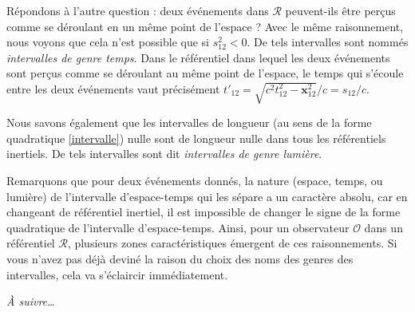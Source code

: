 		Répondons à l'autre question : deux événements dans $\mathscr{R}$ peuvent-ils être perçus comme se déroulant en un même point de l'espace ? Avec le même raisonnement, nous voyons que cela n'est possible que si $s_{12}^2<0$. De tels intervalles sont nommés \emph{intervalles de genre temps}. Dans le référentiel dans lequel les deux événements sont perçus comme se déroulant au même point de l'espace, le temps qui s'écoule entre les deux événements vaut précisément $t'_{12}=\sqrt{c^2t_{12}^2-\bm{x}_{12}^2	}/c=s_{12}/c$. 

		Nous savons également que les intervalles de longueur (au sens de la forme quadratique \eqref{intervalle}) nulle sont de longueur nulle dans tous les référentiels inertiels. De tels intervalles sont dit \emph{intervalles de genre lumière}. 

		Remarquons que pour deux événements donnés, la nature (espace, temps, ou lumière) de l'intervalle d'espace-temps qui les sépare a un caractère absolu, car en changeant de référentiel inertiel, il est impossible de changer le signe de la forme quadratique de l'intervalle d'espace-temps. Ainsi, pour un observateur $\mathscr{O}$ dans un référentiel $\mathscr{R}$, plusieurs zones caractéristiques émergent de ces raisonnements. Si vous n'avez pas déjà deviné la raison du choix des noms des genres des intervalles, cela va s'éclaircir immédiatement.

		\emph{À suivre\ldots}

